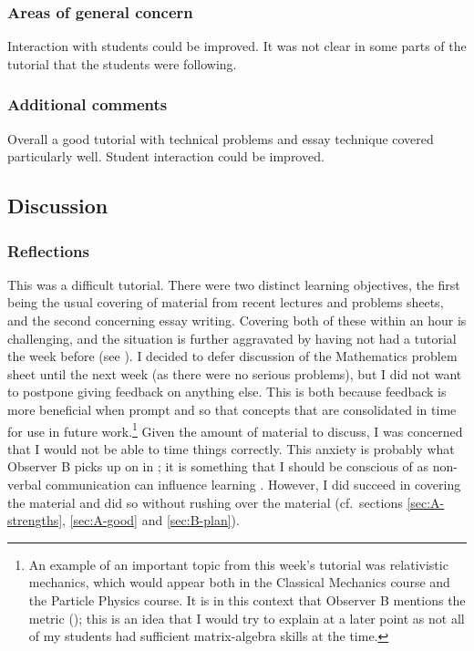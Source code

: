 \subsubsection{Areas of general concern}\label{sec:B-concern}

Interaction with students could be improved. It was not clear in some parts of the tutorial that the students were following.

\subsubsection{Additional comments}

Overall a good tutorial with technical problems and essay technique covered particularly well. Student interaction could be improved.


\subsection{Discussion}\label{sec:me-discuss}

\subsubsection{Reflections}

This was a difficult tutorial. There were two distinct learning objectives, the first being the usual covering of material from recent lectures and problems sheets, and the second concerning essay writing. Covering both of these within an hour is challenging, and the situation is further aggravated by having not had a tutorial the week before (see ). I decided to defer discussion of the Mathematics problem sheet until the next week (as there were no serious problems), but I did not want to postpone giving feedback on anything else. This is both because feedback is more beneficial when prompt \citep[chapter 4]{Gibbs2015,Jaques2007} and so that concepts that are consolidated in time for use in future work.\footnote{An example of an important topic from this week's tutorial was relativistic mechanics, which would appear both in the Classical Mechanics course and the Particle Physics course. It is in this context that Observer B mentions the metric (); this is an idea that I would try to explain at a later point as not all of my students had sufficient matrix-algebra skills at the time.} Given the amount of material to discuss, I was concerned that I would not be able to time things correctly. This anxiety is probably what Observer B picks up on in ; it is something that I should be conscious of as non-verbal communication can influence learning \citep[chapter 2]{Brown1988}. However, I did succeed in covering the material and did so without rushing over the material (cf.\ sections \ref{sec:A-strengths}, \ref{sec:A-good} and \ref{sec:B-plan}).


